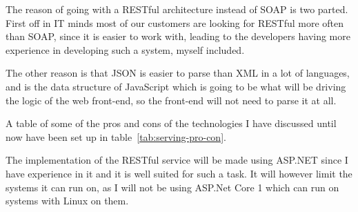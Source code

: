 The reason of going with a RESTful architecture instead of SOAP is two parted.
First off in IT minds most of our customers are looking for RESTful more often
than SOAP, since it is easier to work with, leading to the developers having
more experience in developing such a system, myself included. 

The other reason is that JSON is easier to parse than XML in a lot of languages,
and is the data structure of  JavaScript which is going to be what will be
driving the logic of the web front-end, so the front-end will not need to parse it
at all. 

A table of some of the pros and cons of the technologies I have discussed until
now have been set up in table~\ref{tab:serving-pro-con}. 

\begin{table}[h]
  \caption{Pros and cons of different ways of serving the data}
  \label{tab:serving-pro-con}
\end{table}

The implementation of the RESTful service will be made using ASP.NET since I
have experience in it and it is well suited for such a task. It will however
limit the systems it can run on, as I will not be using ASP.Net Core 1 which can
run on systems with Linux on them\cite{asp5:intro}. 

